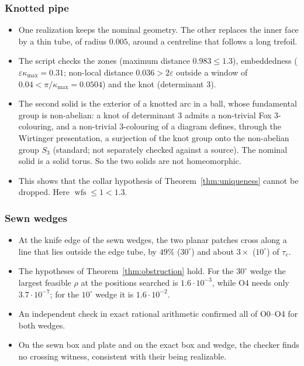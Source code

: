 \documentclass[preprint,12pt]{elsarticle}
\theoremstyle{definition}
\theoremstyle{remark}
\newcommand{\wfs}{\operatorname{wfs}}
\begin{document}
\subsubsection*{Knotted pipe}
\begin{itemize}
\item One realization keeps the nominal geometry. The other replaces the inner face by a thin tube, of radius
$0.005$, around a centreline that follows a long trefoil.
\item The script checks the zones (maximum distance $0.983\le1.3$), embeddedness ($\varepsilon\kappa_{\max}=0.31$;
non-local distance $0.036>2\varepsilon$ outside a window of $0.04<\pi/\kappa_{\max}=0.0504$) and the knot
(determinant $3$).
\item The second solid is the exterior of a knotted arc in a ball, whose
fundamental group is non-abelian: a knot of determinant $3$ admits a non-trivial Fox $3$-colouring, and a
non-trivial $3$-colouring of a diagram defines, through the Wirtinger presentation, a surjection of the knot group onto
the non-abelian group $S_3$ (standard; not separately checked against a source). The nominal
solid is a solid torus. So the two solids are not homeomorphic.
\item This shows that the collar hypothesis of Theorem~\ref{thm:uniqueness} cannot be dropped. Here
$\wfs\le1<1.3$.
\end{itemize}

\subsubsection*{Sewn wedges}
\begin{itemize}
\item At the knife edge of the sewn wedges, the two planar patches cross along a line that lies outside the edge
tube, by $49\%$ ($30^\circ$) and about $3\times$ ($10^\circ$) of $\tau_e$.
\item The hypotheses of Theorem~\ref{thm:obstruction} hold. For the $30^\circ$ wedge the largest feasible $\rho$ at
the positions searched is $1.6\cdot10^{-3}$, while O4 needs only $3.7\cdot10^{-7}$; for the $10^\circ$ wedge it is
$1.6\cdot10^{-2}$.
\item An independent check in exact rational arithmetic confirmed all of O0--O4 for both wedges.
\item On the sewn box and plate and on the exact box and wedge, the checker finds no crossing witness, consistent
with their being realizable.
\end{itemize}
\end{document}
